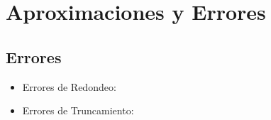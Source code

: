 \chapter{Aproximaciones y Errores}
\section{Errores}
\begin{itemize}
\item Errores de Redondeo:
\item Errores de Truncamiento:
\end{itemize}